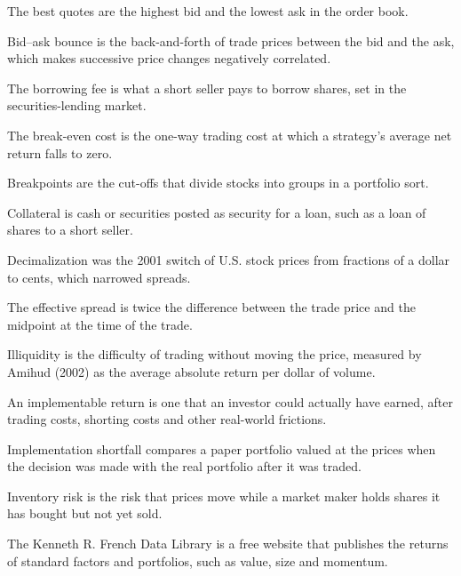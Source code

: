 \begin{keyterms}
\footnotesize
\begin{description}[leftmargin=0pt, itemsep=0pt, parsep=0pt, topsep=0pt, font=\normalfont\bfseries\color{FEMaroon}]
  \item[Best quotes.] The best quotes are the highest bid and the lowest ask in the order book.
  \item[Bid--ask bounce.] Bid--ask bounce is the back-and-forth of trade prices between the bid and the ask, which makes successive price changes negatively correlated.
  \item[Borrowing fee.] The borrowing fee is what a short seller pays to borrow shares, set in the securities-lending market.
  \item[Break-even cost.] The break-even cost is the one-way trading cost at which a strategy's average net return falls to zero.
  \item[Breakpoints.] Breakpoints are the cut-offs that divide stocks into groups in a portfolio sort.
  \item[Collateral.] Collateral is cash or securities posted as security for a loan, such as a loan of shares to a short seller.
  \item[Decimalization.] Decimalization was the 2001 switch of U.S. stock prices from fractions of a dollar to cents, which narrowed spreads.
  \item[Effective spread.] The effective spread is twice the difference between the trade price and the midpoint at the time of the trade.
  \item[Illiquidity.] Illiquidity is the difficulty of trading without moving the price, measured by Amihud (2002) as the average absolute return per dollar of volume.
  \item[Implementable return.] An implementable return is one that an investor could actually have earned, after trading costs, shorting costs and other real-world frictions.
  \item[Implementation shortfall.] Implementation shortfall compares a paper portfolio valued at the prices when the decision was made with the real portfolio after it was traded.
  \item[Inventory risk.] Inventory risk is the risk that prices move while a market maker holds shares it has bought but not yet sold.
  \item[Kenneth R. French Data Library.] The Kenneth R. French Data Library is a free website that publishes the returns of standard factors and portfolios, such as value, size and momentum.

\end{description}
\end{keyterms}
